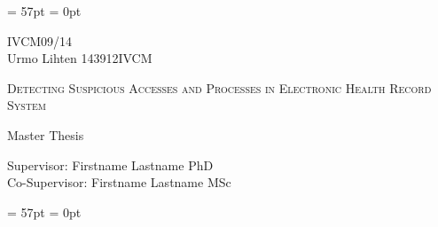 \documentclass[a4paper, 12pt]{article}
\begin{document}
\thispagestyle{fancy} 
\renewcommand{\headrulewidth}{0pt} 
\renewcommand{\footrulewidth}{0pt} 
\headheight = 57pt 
\headsep = 0pt 

\vspace*{7 cm}

\begin{center} 
IVCM09/14\\[0cm]
Urmo Lihten 143912IVCM\\
\begin{LARGE}
	\textsc{Detecting Suspicious Accesses and Processes in Electronic Health Record System	\\}
\end{LARGE}
Master Thesis\\[2cm]
\end{center}

\begin{flushright} %
Supervisor: Firstname Lastname PhD\\

Co-Supervisor: Firstname Lastname MSc\\[0cm]

\end{flushright}

\pagebreak %

\thispagestyle{fancy} %
\renewcommand{\headrulewidth}{0pt} %
\renewcommand{\footrulewidth}{0pt} %
\headheight = 57pt %
\headsep = 0pt %

\end{document}
